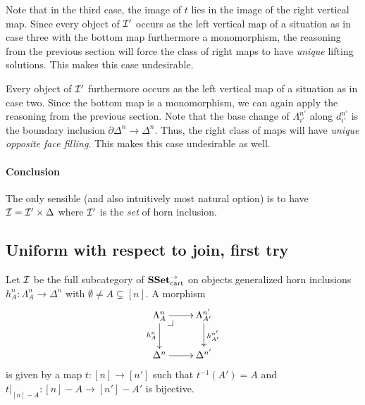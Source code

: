 \documentclass[reqno,10pt,a4paper,oneside]{amsart}
\begin{document}
Note that in the third case, the image of $t$ lies in the image of the right vertical map.
Since every object of $\cal{I'}$ occurs as the left vertical map of a situation as in case three with the bottom map furthermore a monomorphism, the reasoning from the previous section will force the class of right maps to have \emph{unique} lifting solutions.
This makes this case undesirable.

Every object of $\cal{I'}$ furthermore occurs as the left vertical map of a situation as in case two.
Since the bottom map is a monomorphism, we can again apply the reasoning from the previous section.
Note that the base change of $\Lambda_{i'}^{n'}$ along $d_{i'}^{n'}$ is the boundary inclusion $\partial \Delta^n \to \Delta^n$.
Thus, the right class of maps will have \emph{unique opposite face filling}.
This makes this case undesirable as well.

\paragraph{Conclusion}

The only sensible (and also intuitively most natural option) is to have $\cal{I} = \cal{I'} \times \Delta$ where $\cal{I'}$ is the \emph{set} of horn inclusion.

\subsection*{Uniform with respect to join, first try}

Let $\cal{I}$ be the full subcategory of $\SSet_{\text{cart}}^{\to}$ on objects generalized horn inclusions $h_A^n : \Lambda_A^n \to \Delta^n$ with $\emptyset \neq A \subsetneq [n]$.
A morphism
\[
\xymatrix{
  \Lambda_A^n
  \ar[r]
  \ar[d]_{h_A^n}
  \pullback{dr}
&
  \Lambda_{A'}^{n'}
  \ar[d]^{h_{A'}^{n'}}
\\
  \Delta^{n}
  \ar[r]
&
  \Delta^{n'}
}
\] 
is given by a map $t : [n] \to [n']$ such that $t^{-1}(A') = A$ and $t|_{[n] - A} : [n] - A \to [n'] - A'$ is bijective.

\end{document}
